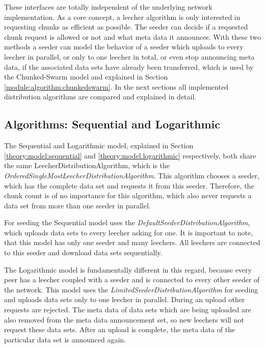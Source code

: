These interfaces are totally independent of the underlying network implementation. As a core concept, a leecher algorithm is only interested in requesting chunks as efficient as possible. The seeder can decide if a requested chunk request is allowed or not and what meta data it announces. With these two methods a seeder can model the behavior of a seeder which uploads to every leecher in parallel, or only to one leecher in total, or even stop announcing meta data, if the associated data sets have already been transferred, which is used by the Chunked-Swarm model and explained in Section \ref{module:algorithm:chunkedswarm}. In the next sections all implemented distribution algorithms are compared and explained in detail.

\subsection{Algorithms: Sequential and Logarithmic}
\label{module:algorithm:seqlog}
The Sequential and Logarithmic model, explained in Section \ref{theory:model:sequential} and \ref{theory:model:logarithmic} respectively, both share the same LeecherDistributionAlgorithm, which is the \emph{OrderedSingleMostLeecherDistributionAlgorithm}. This algorithm chooses a seeder, which has the complete data set and requests it from this seeder. Therefore, the chunk count is of no importance for this algorithm, which also never requests a data set from more than one seeder in parallel.

For seeding the Sequential model uses the \emph{DefaultSeederDistributionAlgorithm}, which uploads data sets to every leecher asking for one. It is important to note, that this model has only one seeder and many leechers. All leechers are connected to this seeder and download data sets sequentially. 

The Logarithmic model is fundamentally different in this regard, because every peer has a leecher coupled with a seeder and is connected to every other seeder of the network. This model uses the \emph{LimitedSeederDistributionAlgorithm} for seeding and uploads data sets only to one leecher in parallel. During an upload other requests are rejected. The meta data of data sets which are being uploaded are also removed from the meta data announcement set, so new leechers will not request these data sets. After an upload is complete, the meta data of the particular data set is announced again.

